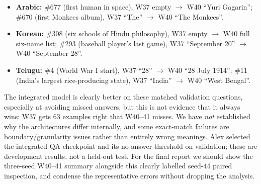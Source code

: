 \documentclass[10pt,a4paper]{article}
\newcommand{\sectionline}[1]{\vspace{5pt}{\large\bfseries #1}\par\vspace{1pt}}
\begin{document}
\sectionline{5. Six cases W40--41 fixed (two per language)}
\begin{itemize}
\item \textbf{Arabic:} \#677 (first human in space), W37 empty $\rightarrow$ W40 ``Yuri Gagarin''; \#670 (first Monkees album), W37 ``The'' $\rightarrow$ W40 ``The Monkees''.
\item \textbf{Korean:} \#308 (six schools of Hindu philosophy), W37 empty $\rightarrow$ W40 full six-name list; \#293 (baseball player's last game), W37 ``September 20'' $\rightarrow$ W40 ``September 28''.
\item \textbf{Telugu:} \#4 (World War I start), W37 ``28'' $\rightarrow$ W40 ``28 July 1914''; \#11 (India's largest rice-producing state), W37 ``India'' $\rightarrow$ W40 ``West Bengal''.
\end{itemize}

\sectionline{My two cents and limitations}
The integrated model is clearly better on these matched validation questions, especially at avoiding missed answers, but this is not evidence that it always wins: W37 gets 63 examples right that W40--41 misses. We have \emph{not} established why the architectures differ internally, and some exact-match failures are boundary/granularity issues rather than entirely wrong meanings. Alex selected the integrated QA checkpoint and its no-answer threshold on validation; these are development results, not a held-out test. For the final report we should show the three-seed W40--41 summary alongside this clearly labelled seed-44 paired inspection, and condense the representative errors without dropping the analysis.
\end{document}
